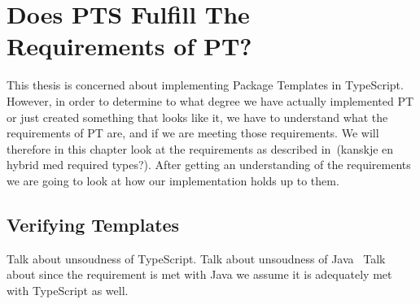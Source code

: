 \chapter{Does PTS Fulfill The Requirements of PT?}\label{ch:does-pts-fulfill-the-requirements-of-pt?}

This thesis is concerned about implementing Package Templates in TypeScript.
However, in order to determine to what degree we have actually implemented PT or just created something that looks like it, we have to understand what the requirements of PT are, and if we are meeting those requirements.
We will therefore in this chapter look at the requirements as described in~\cite{jot}(kanskje en hybrid med required types?).
After getting an understanding of the requirements we are going to look at how our implementation holds up to them.



\section{Verifying Templates}\label{sec:pt-requirements-verifying-templates}

Talk about unsoudness of TypeScript.
Talk about unsoudness of Java~\cite{java-unsound}
Talk about since the requirement is met with Java we assume it is adequately met with TypeScript as well.

